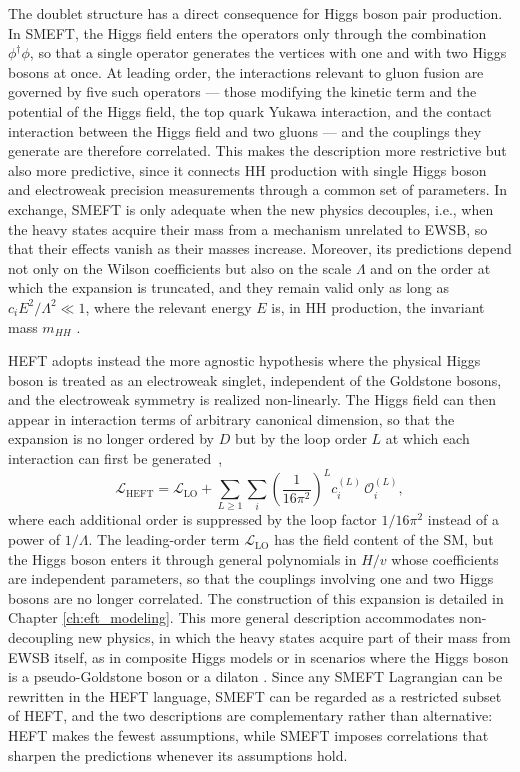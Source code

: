 The doublet structure has a direct consequence for Higgs boson pair production. In SMEFT, the Higgs field enters the operators only through the combination $\phi^\dagger\phi$, so that a single operator generates the vertices with one and with two Higgs bosons at once. At leading order, the interactions relevant to gluon fusion are governed by five such operators — those modifying the kinetic term and the potential of the Higgs field, the top quark Yukawa interaction, and the contact interaction between the Higgs field and two gluons — and the couplings they generate are therefore correlated. This makes the description more restrictive but also more predictive, since it connects HH production with single Higgs boson and electroweak precision measurements through a common set of parameters. In exchange, SMEFT is only adequate when the new physics decouples, i.e., when the heavy states acquire their mass from a mechanism unrelated to EWSB, so that their effects vanish as their masses increase. Moreover, its predictions depend not only on the Wilson coefficients but also on the scale $\Lambda$ and on the order at which the expansion is truncated, and they remain valid only as long as $c_i E^2/\Lambda^2 \ll 1$, where the relevant energy $E$ is, in HH production, the invariant mass $m_{HH}$ \cite{Heinrich:2022huh}.\medskip

HEFT adopts instead the more agnostic hypothesis where the physical Higgs boson is treated as an electroweak singlet, independent of the Goldstone bosons, and the electroweak symmetry is realized non-linearly. The Higgs field can then appear in interaction terms of arbitrary canonical dimension, so that the expansion is no longer ordered by $D$ but by the loop order $L$ at which each interaction can first be generated~\cite{Buchalla:2013rka,Buchalla:2018yce},
\begin{equation}
    \mathcal{L}_{\text{HEFT}}
    = \mathcal{L}_{\text{LO}}
    + \sum_{L\geq1}\sum_i \left(\frac{1}{16\pi^2}\right)^{L} c_i^{(L)}\,\mathcal{O}_i^{(L)},
    \label{eq:heft_lagrangian}
\end{equation}
where each additional order is suppressed by the loop factor $1/16\pi^2$ instead of a power of $1/\Lambda$. The leading-order term $\mathcal{L}_{\text{LO}}$ has the field content of the SM, but the Higgs boson enters it through general polynomials in $H/v$ whose coefficients are independent parameters, so that the couplings involving one and two Higgs bosons are no longer correlated. The construction of this expansion is detailed in Chapter \ref{ch:eft_modeling}. This more general description accommodates non-decoupling new physics, in which the heavy states acquire part of their mass from EWSB itself, as in composite Higgs models or in scenarios where the Higgs boson is a pseudo-Goldstone boson or a dilaton \cite{Agashe:2004rs,Contino:2010mh,Goldberger:2008zz}. Since any SMEFT Lagrangian can be rewritten in the HEFT language, SMEFT can be regarded as a restricted subset of HEFT, and the two descriptions are complementary rather than alternative: HEFT makes the fewest assumptions, while SMEFT imposes correlations that sharpen the predictions whenever its assumptions hold.\medskip

